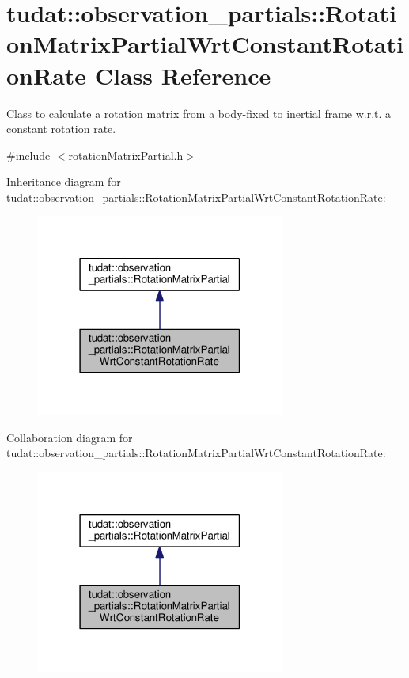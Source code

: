 \hypertarget{classtudat_1_1observation__partials_1_1RotationMatrixPartialWrtConstantRotationRate}{}\section{tudat\+:\+:observation\+\_\+partials\+:\+:Rotation\+Matrix\+Partial\+Wrt\+Constant\+Rotation\+Rate Class Reference}
\label{classtudat_1_1observation__partials_1_1RotationMatrixPartialWrtConstantRotationRate}


Class to calculate a rotation matrix from a body-\/fixed to inertial frame w.\+r.\+t. a constant rotation rate.  




{\ttfamily \#include $<$rotation\+Matrix\+Partial.\+h$>$}



Inheritance diagram for tudat\+:\+:observation\+\_\+partials\+:\+:Rotation\+Matrix\+Partial\+Wrt\+Constant\+Rotation\+Rate\+:
\nopagebreak
\begin{figure}[H]
\begin{center}
\leavevmode
\includegraphics[width=231pt]{classtudat_1_1observation__partials_1_1RotationMatrixPartialWrtConstantRotationRate__inherit__graph}
\end{center}
\end{figure}


Collaboration diagram for tudat\+:\+:observation\+\_\+partials\+:\+:Rotation\+Matrix\+Partial\+Wrt\+Constant\+Rotation\+Rate\+:
\nopagebreak
\begin{figure}[H]
\begin{center}
\leavevmode
\includegraphics[width=231pt]{classtudat_1_1observation__partials_1_1RotationMatrixPartialWrtConstantRotationRate__coll__graph}
\end{center}
\end{figure}
